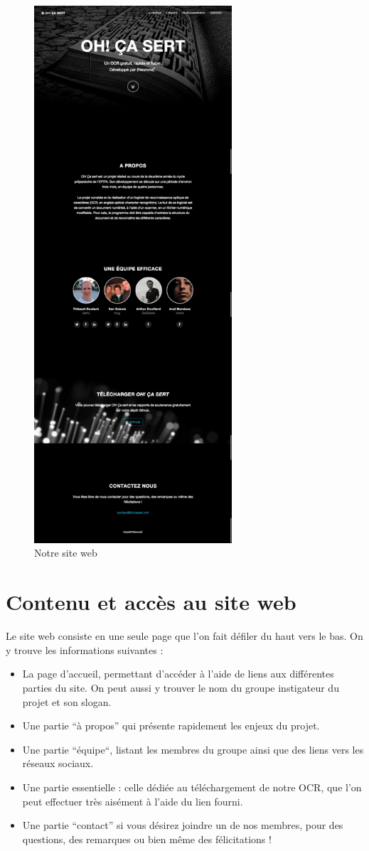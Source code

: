 \documentclass[11pt]{report}
\begin{document}
\begin{figure}[htbp]
\centering
\includegraphics[height=20cm]{www.png}
\caption{Notre site web}
\end{figure}

\section{Contenu et accès au site web}

Le site web consiste en une seule page que l'on fait défiler du haut vers le bas. On y trouve les informations suivantes :

\begin{itemize}
\item La page d’accueil, permettant d'accéder à l'aide de liens aux différentes parties du site. On peut aussi y trouver le nom du groupe instigateur du projet et son slogan.
\item Une partie ``à propos'' qui présente rapidement les enjeux du projet.
\item Une partie ``équipe``, listant les membres du groupe ainsi que des liens vers les réseaux sociaux.
\item Une partie essentielle : celle dédiée au téléchargement de notre OCR, que l'on peut effectuer très aisément à l'aide du lien fourni.
\item Une partie ``contact'' si vous désirez joindre un de nos membres, pour des questions, des remarques ou bien même des félicitations !
\end{itemize}
\end{document}

